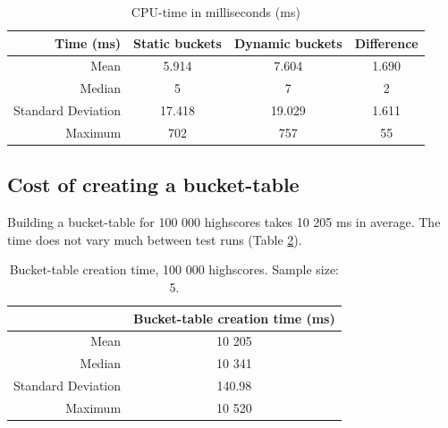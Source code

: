 \begin{table}[h]
  \vspace{4mm}
  \begin{center}
    \begin{tabular}{ r | c c c }
Time (ms) & Static buckets     & Dynamic buckets & Difference \\ \hline
Mean               & 5.914           & 7.604  & 1.690 \\
Median             & 5               & 7      & 2 \\
Standard Deviation & 17.418          & 19.029 & 1.611 \\
Maximum            & 702             & 757   & 55
    \end{tabular} 
    \caption{CPU-time in milliseconds (ms)}
    \label{table:exec-time}
  \end{center} 
\end{table}

\subsection*{Cost of creating a bucket-table}

Building a bucket-table for 100 000 highscores takes 10 205 ms in average. The time does not vary much between test runs (Table \ref{table:bucket-table-creation}).

\begin{table}[h]
  \vspace{4mm}
  \begin{center}
    \begin{tabular}{ r | c }
      & Bucket-table creation time (ms) \\ \hline               
                Mean               & 10 205  \\
                Median             & 10 341  \\
                Standard Deviation & 140.98  \\
                Maximum            & 10 520  \\
    \end{tabular} 
    \caption{Bucket-table creation time, 100 000 highscores. Sample size: 5.}
    \label{table:bucket-table-creation}
  \end{center} 
\end{table}
